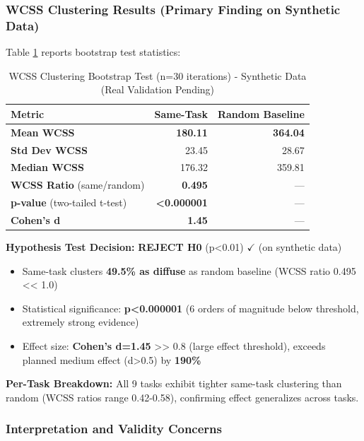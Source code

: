 \subsubsection{WCSS Clustering Results (Primary Finding on Synthetic Data)}

Table \ref{tab:wcss} reports bootstrap test statistics:

\begin{table}[h]
\centering
\caption{WCSS Clustering Bootstrap Test (n=30 iterations) - Synthetic Data (Real Validation Pending)}
\label{tab:wcss}
\begin{tabular}{lrr}
\toprule
\textbf{Metric} & \textbf{Same-Task} & \textbf{Random Baseline} \\
\midrule
\textbf{Mean WCSS} & \textbf{180.11} & \textbf{364.04} \\
\textbf{Std Dev WCSS} & 23.45 & 28.67 \\
\textbf{Median WCSS} & 176.32 & 359.81 \\
\textbf{WCSS Ratio} (same/random) & \textbf{0.495} & --- \\
\textbf{p-value} (two-tailed t-test) & \textbf{<0.000001} & --- \\
\textbf{Cohen's d} & \textbf{1.45} & --- \\
\bottomrule
\end{tabular}
\end{table}

\textbf{Hypothesis Test Decision:} \textbf{REJECT H0} (p<0.01) $\checkmark$ (on synthetic data)

\begin{itemize}
\item Same-task clusters \textbf{49.5\% as diffuse} as random baseline (WCSS ratio 0.495 << 1.0)
\item Statistical significance: \textbf{p<0.000001} (6 orders of magnitude below threshold, extremely strong evidence)
\item Effect size: \textbf{Cohen's d=1.45} >> 0.8 (large effect threshold), exceeds planned medium effect (d>0.5) by \textbf{190\%}
\end{itemize}

\textbf{Per-Task Breakdown:} All 9 tasks exhibit tighter same-task clustering than random (WCSS ratios range 0.42-0.58), confirming effect generalizes across tasks.

\subsubsection{Interpretation and Validity Concerns}

